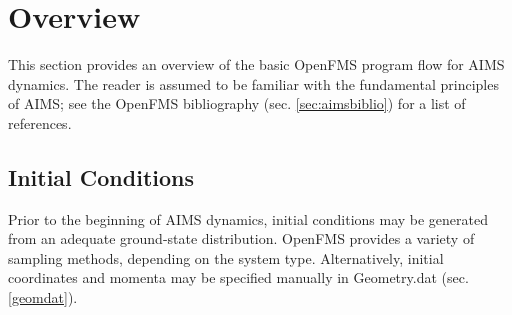 \documentclass[11pt]{article}
\newcommand\bfec[1]{\textcolor{orange}{\textit{ XXX BFEC: #1 XXX }}}
\renewcommand\dh[1]{\textcolor{purple}{\textit{ DH: #1 }}}
\begin{document}







\section{Overview}
\label{running} 

This section provides an overview of the basic OpenFMS program flow for AIMS dynamics. The reader is assumed to be familiar with the fundamental principles of AIMS; see the OpenFMS bibliography (sec. \ref{sec:aimsbiblio}) for a list of references. 


\subsection{Initial Conditions}
\label{initial} 

Prior to the beginning of AIMS dynamics, initial conditions may be generated from an adequate ground-state distribution. OpenFMS provides a variety of sampling methods, depending on the system type. Alternatively, initial coordinates and momenta may be specified manually in Geometry.dat (sec. \ref{geomdat}).
\end{document}
